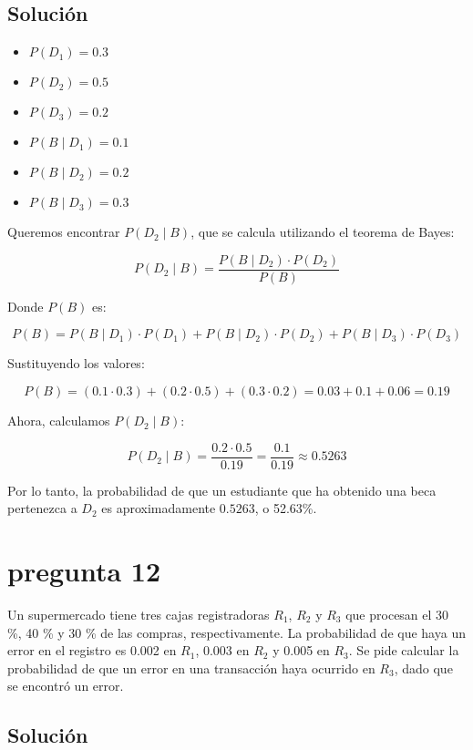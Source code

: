 \documentclass[12pt,a4paper]{article}
\begin{document}
\subsection*{Solución}

\begin{itemize}
    \item \( P(D_1) = 0.3 \)
    \item \( P(D_2) = 0.5 \)
    \item \( P(D_3) = 0.2 \)
    \item \( P(B \mid D_1) = 0.1 \)
    \item \( P(B \mid D_2) = 0.2 \)
    \item \( P(B \mid D_3) = 0.3 \)
\end{itemize}

Queremos encontrar \( P(D_2 \mid B) \), que se calcula utilizando el teorema de Bayes:

\[
P(D_2 \mid B) = \frac{P(B \mid D_2) \cdot P(D_2)}{P(B)}
\]

Donde \( P(B) \) es:

\[
P(B) = P(B \mid D_1) \cdot P(D_1) + P(B \mid D_2) \cdot P(D_2) + P(B \mid D_3) \cdot P(D_3)
\]

Sustituyendo los valores:

\[
P(B) = (0.1 \cdot 0.3) + (0.2 \cdot 0.5) + (0.3 \cdot 0.2) = 0.03 + 0.1 + 0.06 = 0.19
\]

Ahora, calculamos \( P(D_2 \mid B) \):

\[
P(D_2 \mid B) = \frac{0.2 \cdot 0.5}{0.19} = \frac{0.1}{0.19} \approx 0.5263
\]

Por lo tanto, la probabilidad de que un estudiante que ha obtenido una beca pertenezca a \( D_2 \) es aproximadamente \( 0.5263 \), o 52.63\%.

\newpage 
\section*{pregunta 12}
Un supermercado tiene tres cajas registradoras \( R_1 \), \( R_2 \) y \( R_3 \) que procesan el 30 \%, 40 \% y 30 \% de las compras, respectivamente. La probabilidad de que haya un error en el registro es 0.002 en \( R_1 \), 0.003 en \( R_2 \) y 0.005 en \( R_3 \). Se pide calcular la probabilidad de que un error en una transacción haya ocurrido en \( R_3 \), dado que se encontró un error.

\subsection*{Solución}
\end{document}
